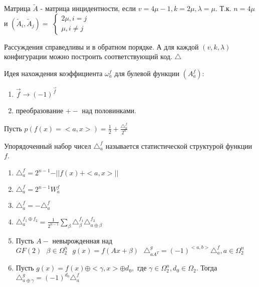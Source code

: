 Матрица $\tilde{A}$ - матрица инцидентности, если $v = 4\mu - 1, k = 2\mu, \lambda = \mu$.
Т.к. $n = 4\mu$ и $(\tilde{A}_i, \tilde{A}_j) = $
$\begin{cases}
	2\mu, i = j \\
	\mu, i\neq j
\end{cases}$

Рассуждения справедливы и в обратном порядке. А для каждой $(v, k, \lambda)$ конфигурации
можно построить соответствующий код. $\triangle $

Идея нахождения коэффициента $\omega_a^f$ для булевой функции $(A_a^f)$:
\begin{enumerate}
	\item $\overrightarrow{f} \rightarrow (-1)^{\overrightarrow{f}}$
	\item преобразование $+-$ над половинками.
\end{enumerate}

$\text{Пусть } p(f(x) = <a, x>) = \frac{1}{2} + \frac{\triangle_a^f}{2^n}$

\opr
Упорядоченный набор чисел $\triangle_a^f$ называется статистической структурой функции $f$.

\utv
\begin{enumerate}
	\item $\triangle_a^f = 2^{n - 1} - \vert\vert f(x) + <a, x> \vert\vert$
	\item $\triangle_a^f = 2^{n - 1} W_a^f$
	\item $\triangle_a^f = -\triangle_a^f$
	\item $\triangle_a^{f_1 \oplus f_2} = \frac{1}{2^{n - 1}} \sum_{\beta}\triangle_{\beta}^{f_1}\triangle_{a \oplus \beta}^{f_2}$
	\item $\text{Пусть } A -$ невырожденная над $GF(2) \text{ } \beta \in \Omega_2^n \text{ } g(x) = f(Ax + \beta) \text{ } \triangle_{aA^T}^g = (-1)^{<a,b>}\triangle_a^f, a \in \Omega_2^n$
	\item $\text{Пусть } g(x) = f(x) \oplus <\gamma, x> \oplus d_0, $ где $\gamma \in \Omega_2^n, d_0 \in \Omega_2$.
	Тогда $\triangle_{a\oplus\gamma}^g = (-1)^{d_0}\triangle_a^f$
\end{enumerate}